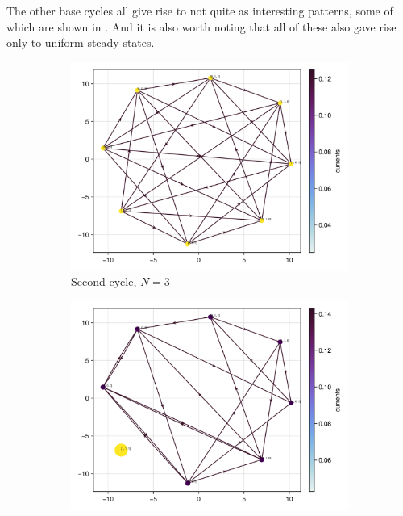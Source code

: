 \documentclass[11pt]{article}
\begin{document}
The other base cycles all give rise to not quite as interesting patterns, some of which are shown in  .
And it is also worth noting that all of these also gave rise only to uniform steady states.

\begin{figure}[H]
    \centering
    \begin{subfigure}[t]{0.49\textwidth}
        \centering
        \includegraphics[width=\textwidth]{../../plots/ones/c2/spring_N=3_metadata=(chash=835941404624685282,ctype=simple).png}
        \caption{Second cycle, $N=3$}
    \end{subfigure}
    \begin{subfigure}[t]{0.49\textwidth}
        \centering
        \includegraphics[width=\textwidth]{../../plots/ones/c3/spring_N=3_metadata=(chash=14397644121192019449,ctype=simple).png}

\end{subfigure}
\end{figure}
\end{document}
